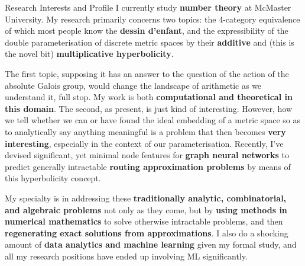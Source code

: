 \begin{rSection}{Research Interests and Profile}
I currently study {\bf number theory} at McMaster University. My research primarily concerns two topics: the 4-category equivalence of which most people know the {\bf dessin d'enfant}, and the expressibility of the double parameterisation of discrete metric spaces by their {\bf additive} and (this is the novel bit) {\bf multiplicative hyperbolicity}.

The first topic, supposing it has an answer to the question of the action of the absolute Galois group, would change the landscape of arithmetic as we understand it, full stop. My work is both {\bf computational and theoretical in this domain}.
The second, as present, is just kind of interesting. However, how we tell whether we can or have found the ideal embedding of a metric space so as to analytically say anything meaningful is a problem that then becomes {\bf very interesting}, especially in the context of our parameterisation. Recently, I've devised significant, yet minimal node features for {\bf graph neural networks} to predict generally intractable {\bf routing approximation problems} by means of this hyperbolicity concept.

My specialty is in addressing these {\bf traditionally analytic, combinatorial, and algebraic problems} not only as they come, but by {\bf using methods in numerical mathematics} to solve otherwise intractable problems, and then {\bf regenerating exact solutions from approximations}. I also do a shocking amount of {\bf data analytics and machine learning} given my formal study, and all my research positions have ended up involving ML significantly.

\end{rSection}